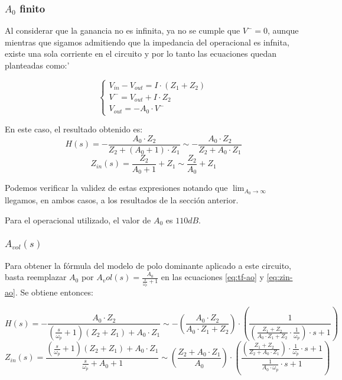 \documentclass[../../main.tex]{subfiles}
\begin{document}
\subsubsection{$A_0$ finito}
Al considerar que la ganancia no es infinita, ya no se cumple que $V^-=0$, aunque mientras que sigamos admitiendo que la impedancia del operacional es infnita, existe una sola corriente en el circuito y por lo tanto las ecuaciones quedan planteadas como:'

 \[
	\left\{
 	\begin{array}{ll}
		V_{in} - V_{out} = I\cdot (Z_1+Z_2)\\
		V^- = V_{out} + I\cdot Z_2\\
		V_{out} = - A_0 \cdot V^-
	\end{array}
	\right.
 \]

En este caso, el resultado obtenido es:
\begin{equation} \label{eq:tf-ao} H(s) =-\frac{A_0\cdot Z_2}{Z_2+(A_0+1)\cdot Z_1} 
						\sim-\frac{A_0\cdot Z_2}{Z_2+A_0\cdot Z_1}  \end{equation}
\begin{equation} \label{eq:zin-ao} Z_{in}(s) = \frac{Z_2}{A_0+1} +Z_1 \sim  \frac{Z_2}{A_0} +Z_1 \end{equation}

Podemos verificar la validez de estas expresiones notando que $\lim_{A_0\to\infty}$ llegamos, en ambos casos, a los resultados de la secci\'on anterior.\par

Para el operacional utilizado, el valor de $A_0$ es $110dB$.

\subsubsection{$A_{vol}(s)$}
Para obtener la f\'ormula del modelo de polo dominante aplicado a este circuito, basta reemplazar $A_0$ por $A_vol(s)=\frac{A_0}{\frac{s}{\omega_p} +1}$ en las ecuaciones \ref{eq:tf-ao} y \ref{eq:zin-ao}. Se obtiene entonces:

\begin{equation} \label{eq:tf-avol} H(s) =-\frac{A_0\cdot Z_2}{\left(\frac{s}{\omega_p}+1\right)\left(Z_2+Z_1\right) + A_0 \cdot Z_1}  \sim
- \left(\frac{A_0 \cdot Z_2}{A_0 \cdot Z_1 + Z_2}\right) \cdot \left(\frac{1}{\left(\frac{Z_1 + Z_2}{A_0 \cdot Z_1 + Z_2} \cdot \frac{1}{\omega_p}\right) \cdot s + 1}\right)
\end{equation}
\begin{equation} \label{eq:zin-avol} Z_{in}(s) = \frac{\left(\frac{s}{\omega_p}+1\right)\left(Z_2+Z_1\right)+ A_0 \cdot Z_1}{\frac{s}{\omega_p}+A_0+1}
\sim \left(\frac{Z_2 + A_0 \cdot Z_1}{A_0}\right) \cdot \left(\frac{ \left(\frac{Z_1+Z_2}{Z_2+A_0\cdot Z_1}\right)\cdot \frac{1}{\omega_p} \cdot s + 1 }{ \frac{1} {A_0 \cdot \omega_p} \cdot s + 1}\right) \end{equation}
\end{document}
